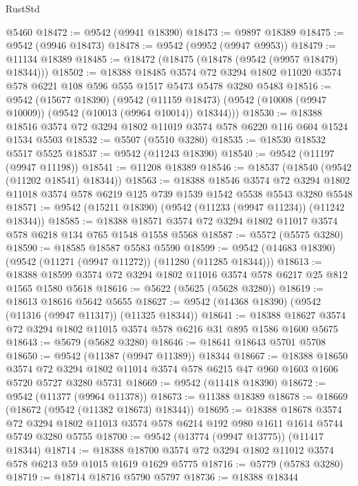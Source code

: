 \begin{lexlean}{RustStd}
\begin{coremodule}
    @5460
@18472 := @9542 (@9941 @18390)
@18473 := @9897 @18389
@18475 := @9542 (@9946 @18473)
@18478 := @9542 (@9952 (@9947 @9953))
@18479 := @11134 @18389
@18485 := @18472 (@18475 (@18478 (@9542 (@9957 @18479) @18344)))
@18502 := @18388
    @18485
    @3574
    @72
    @3294
    @1802
    @11020
    @3574
    @578
    @6221
    @108
    @596
    @555
    @1517
    @5473
    @5478
    @3280
    @5483
@18516 := @9542
    (@15677 @18390)
    (@9542 (@11159 @18473) (@9542 (@10008 (@9947 @10009)) (@9542 (@10013 (@9964 @10014)) @18344)))
@18530 := @18388 @18516 @3574 @72 @3294 @1802 @11019 @3574 @578 @6220 @116 @604 @1524 @1534 @5503
@18532 := @5507 (@5510 @3280)
@18535 := @18530 @18532 @5517 @5525
@18537 := @9542 (@11243 @18390)
@18540 := @9542 (@11197 (@9947 @11198))
@18541 := @11208 @18389
@18546 := @18537 (@18540 (@9542 (@11202 @18541) @18344))
@18563 := @18388
    @18546
    @3574
    @72
    @3294
    @1802
    @11018
    @3574
    @578
    @6219
    @125
    @739
    @1539
    @1542
    @5538
    @5543
    @3280
    @5548
@18571 := @9542 (@15211 @18390) (@9542 (@11233 (@9947 @11234)) (@11242 @18344))
@18585 := @18388 @18571 @3574 @72 @3294 @1802 @11017 @3574 @578 @6218 @134 @765 @1548 @1558 @5568
@18587 := @5572 (@5575 @3280)
@18590 := @18585 @18587 @5583 @5590
@18599 := @9542 (@14683 @18390) (@9542 (@11271 (@9947 @11272)) (@11280 (@11285 @18344)))
@18613 := @18388 @18599 @3574 @72 @3294 @1802 @11016 @3574 @578 @6217 @25 @812 @1565 @1580 @5618
@18616 := @5622 (@5625 (@5628 @3280))
@18619 := @18613 @18616 @5642 @5655
@18627 := @9542 (@14368 @18390) (@9542 (@11316 (@9947 @11317)) (@11325 @18344))
@18641 := @18388 @18627 @3574 @72 @3294 @1802 @11015 @3574 @578 @6216 @31 @895 @1586 @1600 @5675
@18643 := @5679 (@5682 @3280)
@18646 := @18641 @18643 @5701 @5708
@18650 := @9542 (@11387 (@9947 @11389)) @18344
@18667 := @18388
    @18650
    @3574
    @72
    @3294
    @1802
    @11014
    @3574
    @578
    @6215
    @47
    @960
    @1603
    @1606
    @5720
    @5727
    @3280
    @5731
@18669 := @9542 (@11418 @18390)
@18672 := @9542 (@11377 (@9964 @11378))
@18673 := @11388 @18389
@18678 := @18669 (@18672 (@9542 (@11382 @18673) @18344))
@18695 := @18388
    @18678
    @3574
    @72
    @3294
    @1802
    @11013
    @3574
    @578
    @6214
    @192
    @980
    @1611
    @1614
    @5744
    @5749
    @3280
    @5755
@18700 := @9542 (@13774 (@9947 @13775)) (@11417 @18344)
@18714 := @18388 @18700 @3574 @72 @3294 @1802 @11012 @3574 @578 @6213 @59 @1015 @1619 @1629 @5775
@18716 := @5779 (@5783 @3280)
@18719 := @18714 @18716 @5790 @5797
@18736 := @18388
    @18344

\end{coremodule}
\end{lexlean}

